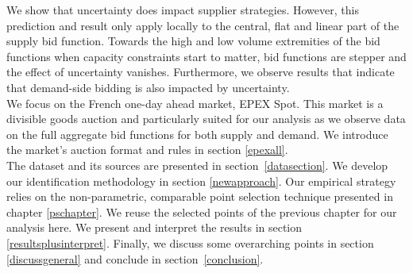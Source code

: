 \label{introresults}
We show that uncertainty does impact supplier strategies. However, this prediction and result only apply locally to the central, flat and linear part of the supply bid function. Towards the high and low volume extremities of the bid functions when capacity constraints start to matter, bid functions are stepper and the effect of uncertainty vanishes. Furthermore, we observe results that indicate that demand-side bidding is also impacted by uncertainty.  \\


We focus on the French one-day ahead market, EPEX Spot. This market is a divisible goods auction and 
particularly suited for our analysis as we observe data on the full aggregate bid functions for both supply and demand.  We introduce the market's auction format and rules in section \ref{epexall}.\\

The dataset and its sources are presented in section~\ref{datasection}.
We develop our identification methodology in section \ref{newapproach}. Our empirical strategy relies on the non-parametric, comparable point selection technique presented in chapter \ref{pschapter}. 
We reuse the selected points of the previous chapter for our analysis here. 
We present and interpret the results in section \ref{resultsplusinterpret}. 
Finally, we discuss some overarching points in section \ref{discussgeneral} and conclude in section~\ref{conclusion}.


